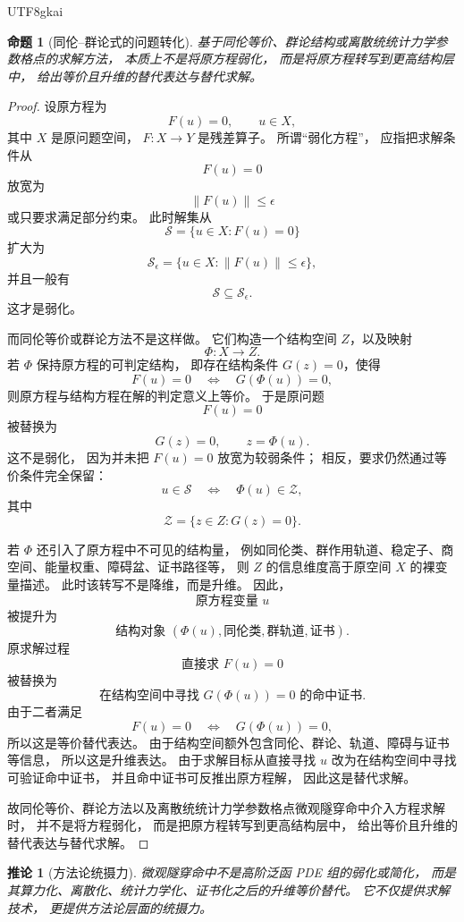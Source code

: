 \documentclass[12pt]{article}
\newtheorem{proposition}{命题}[section]
\newtheorem{corollary}{推论}[section]
\begin{document}
\begin{CJK*}{UTF8}{gkai}
\begin{proposition}[同伦--群论式的问题转化]
\label{prop:tex53-not-weakening}
基于同伦等价、群论结构或离散统统计力学参数格点的求解方法，
本质上不是将原方程弱化，
而是将原方程转写到更高结构层中，
给出等价且升维的替代表达与替代求解。
\end{proposition}

\begin{proof}
设原方程为
\[
  F(u)=0,
  \qquad
  u\in X,
\]
其中 \(X\) 是原问题空间，
\(F:X\to Y\) 是残差算子。
所谓“弱化方程”，
应指把求解条件从
\[
  F(u)=0
\]
放宽为
\[
  \|F(u)\|\le\epsilon
\]
或只要求满足部分约束。
此时解集从
\[
  \mathcal S
  =
  \{u\in X:F(u)=0\}
\]
扩大为
\[
  \mathcal S_\epsilon
  =
  \{u\in X:\|F(u)\|\le\epsilon\},
\]
并且一般有
\[
  \mathcal S\subseteq\mathcal S_\epsilon.
\]
这才是弱化。

而同伦等价或群论方法不是这样做。
它们构造一个结构空间 \(Z\)，以及映射
\[
  \Phi:X\to Z.
\]
若 \(\Phi\) 保持原方程的可判定结构，
即存在结构条件 \(G(z)=0\)，使得
\[
  F(u)=0
  \quad\Longleftrightarrow\quad
  G(\Phi(u))=0,
\]
则原方程与结构方程在解的判定意义上等价。
于是原问题
\[
  F(u)=0
\]
被替换为
\[
  G(z)=0,
  \qquad
  z=\Phi(u).
\]
这不是弱化，
因为并未把 \(F(u)=0\) 放宽为较弱条件；
相反，要求仍然通过等价条件完全保留：
\[
  u\in\mathcal S
  \quad\Longleftrightarrow\quad
  \Phi(u)\in\mathcal Z,
\]
其中
\[
  \mathcal Z
  =
  \{z\in Z:G(z)=0\}.
\]

若 \(\Phi\) 还引入了原方程中不可见的结构量，
例如同伦类、群作用轨道、稳定子、商空间、能量权重、障碍盆、证书路径等，
则 \(Z\) 的信息维度高于原空间 \(X\) 的裸变量描述。
此时该转写不是降维，而是升维。
因此，
\[
  \text{原方程变量 }u
\]
被提升为
\[
  \text{结构对象 }(\Phi(u),\text{同伦类},\text{群轨道},\text{证书}).
\]
原求解过程
\[
  \text{直接求 }F(u)=0
\]
被替换为
\[
  \text{在结构空间中寻找 }G(\Phi(u))=0\text{ 的命中证书}.
\]
由于二者满足
\[
  F(u)=0
  \quad\Longleftrightarrow\quad
  G(\Phi(u))=0,
\]
所以这是等价替代表达。
由于结构空间额外包含同伦、群论、轨道、障碍与证书等信息，
所以这是升维表达。
由于求解目标从直接寻找 \(u\) 改为在结构空间中寻找可验证命中证书，
并且命中证书可反推出原方程解，
因此这是替代求解。

故同伦等价、群论方法以及离散统统计力学参数格点微观隧穿命中介入方程求解时，
并不是将方程弱化，
而是把原方程转写到更高结构层中，
给出等价且升维的替代表达与替代求解。
\end{proof}

\begin{corollary}[方法论统摄力]
\label{cor:tex53-methodological-sovereignty}
微观隧穿命中不是高阶泛函 PDE 组的弱化或简化，
而是其算力化、离散化、统计力学化、证书化之后的升维等价替代。
它不仅提供求解技术，
更提供方法论层面的统摄力。
\end{corollary}


\end{CJK*}
\end{document}
